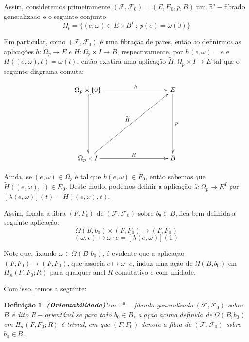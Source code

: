\documentclass[12pt,oneside]{book} %
\newtheorem{defi}   {\hspace{0.5cm}Defini\c c\~ao}[chapter]
\newcommand{\R}{\mathbb{R}}
\newcommand{\wt}{\widetilde}
\begin{document}
\par Assim, consideremos primeiramente $(\mathcal{F},\mathcal{F}_{0})=(E,E_{0},p,B)$ um $\R^{n}-$fibrado generalizado e o seguinte conjunto:
$$ \Omega_{p}=\{ (e,\omega)\in E\times B^{I} \ : \ p(e)=\omega(0) \} $$

\par Em particular, como  $(\mathcal{F},\mathcal{F}_{0})$ é uma fibração de pares, então ao definirmos as aplicações $h:\Omega_{p}\to E$ e $H:\Omega_{p}\times I\to B$, respectivamente, por $h(e,\omega)=e$ e $H((e,\omega),t)=\omega(t)$, então existirá uma aplicação $\wt{H}:\Omega_{p}\times I\to E$ tal que o seguinte diagrama comuta:

$$ \xymatrix @C=0.5cm {
	\Omega_{p}\times \{0\}\ar[rrrrr]^-{h} \ar@{^(->}[ddd] &&&&& E \ar[ddd]^-{p} \\
	&&&&& \\		 
	&&&&& \\				 
	\Omega_{p}\times I \ar[rrrrr]^-{H} \ar[rrrrruuu]^-{\wt{H}} &&&&& B
} $$

\par Ainda, se $(e,\omega)\in \Omega_{p}$ é tal que $h(e,\omega)\in E_{0}$, então sabemos que $\wt{H}((e,\omega),\_)\in E_{0}$. Deste modo, podemos definir a aplicação $\lambda:\Omega_{p}\to E^{I}$ por $\left[ \lambda(e,\omega) \right](t)=\wt{H}((e,\omega),t)$.

\par Assim, fixada a fibra $(F,F_{0})$ de $(\mathcal{F},\mathcal{F}_{0})$ sobre $b_{0}\in B$, fica bem definida a seguinte aplicação:
$$ \Omega(B,b_{0})\times (F,F_{0}) \to (F,F_{0}) $$
$$ (\omega,e)\longmapsto \omega\cdot e=[\lambda(e,\omega)](1) $$

\par Note que, fixando $\omega\in \Omega(B,b_{0})$, é evidente que a aplicação $(F,F_{0})\to (F,F_{0})$, que associa $e\mapsto \omega\cdot e$, induz uma ação de $\Omega(B,b_{0})$ em $H_{n}(F,F_{0};R)$ para qualquer anel $R$ comutativo e com unidade.

\par Com isso, temos a seguinte:

\begin{defi}{\bf (Orientabilidade)}\label{defi_orient}
	Um $\R^{n}-$fibrado generalizado $(\mathcal{F},\mathcal{F}_{0})$ sobre $B$ é dito $R-$orientável se para todo $b_{0}\in B$, a ação acima definida de $\Omega(B,b_{0})$ em $H_{n}(F,F_{0};R)$ é trivial, em que $(F,F_{0})$ denota a fibra de $(\mathcal{F},\mathcal{F}_{0})$ sobre $b_{0}\in B$.
\end{defi}
\end{document}
